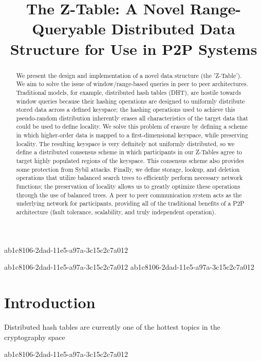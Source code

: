 \documentclass[12pt]{article}
\title{The Z-Table: A Novel Range-Queryable Distributed Data Structure for Use in P2P Systems}
\begin{document}
\maketitle

ab1c8106-2dad-11e5-a97a-3c15c2c7a012\begin{abstract}
We present the design and implementation of a novel data structure (the 'Z-Table'). We aim to solve the issue of window/range-based queries in peer to peer architectures. Traditional models, for example,  distributed hash tables (DHT), are hostile towards window queries because their hashing operations are designed to uniformly distribute stored data across a defined keyspace; the hashing operations used to achieve this pseudo-random distribution inherently erases all characteristics of the target data that could be used to define locality. We solve this problem of erasure by defining a scheme in which higher-order data is mapped to a first-dimensional keyspace, while preserving locality. The resulting keyspace is very definitely not uniformly distributed, so we define a distributed consensus scheme in which participants in our Z-Tables agree to target highly populated regions of the keyspace. This consensus scheme also provides some protection from Sybil attacks. Finally, we define storage, lookup, and deletion operations that utilize balanced search trees to efficiently perform necessary network functions; the preservation of locality allows us to greatly optimize these operations through the use of balanced trees. A peer to peer communication system acts as the underlying network for participants, providing all of the traditional benefits of a P2P architecture (fault tolerance, scalability, and truly independent operation).
\end{abstract}

ab1c8106-2dad-11e5-a97a-3c15c2c7a012
\newpage
ab1c8106-2dad-11e5-a97a-3c15c2c7a012\section{Introduction}
Distributed hash tables are currently one of the hottest topics in the cryptography space~\cite{Stoica:2001dj,Rowstron:2001ea,Ratnasamy:2001wn}

ab1c8106-2dad-11e5-a97a-3c15c2c7a012\printbibliography
\end{document}
